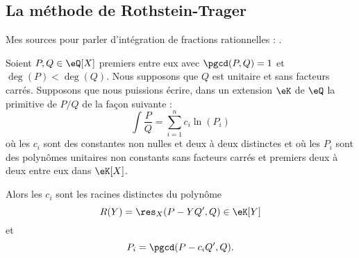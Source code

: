 
\subsection{La méthode de Rothstein-Trager}
\label{subSecBCRYooRVjFpS}

Mes sources pour parler d'intégration de fractions rationnelles : \cite{CPheFRq}.

\begin{theorem} \label{ThoXJFatfu}
	Soient \( P,Q\in \eQ[X]\) premiers entre eux avec \( \pgcd(P,Q)=1\) et \( \deg(P)<\deg(Q)\). Nous supposons que \( Q\) est unitaire et sans facteurs carrés. Supposons que nous puissions écrire, dans un extension \( \eK\) de \( \eQ\) la primitive de \( P/Q\) de la façon suivante :
	\begin{equation}        \label{EqCHVaDay}
		\int\frac{ P }{ Q }=\sum_{i=1}^n c_i\ln(P_i)
	\end{equation}
	où les \( c_i\) sont des constantes non nulles et deux à deux distinctes et où les \( P_i\) sont des polynômes unitaires non constants sans facteurs carrés et premiers deux à deux entre eux dans \( \eK[X]\).

	Alors les \( c_i\) sont les racines distinctes du polynôme
	\begin{equation}
		R(Y)=\res_X(P-YQ',Q)\in \eK[Y]
	\end{equation}
	et
	\begin{equation}
		P_i=\pgcd(P-c_iQ',Q).
	\end{equation}
\end{theorem}

